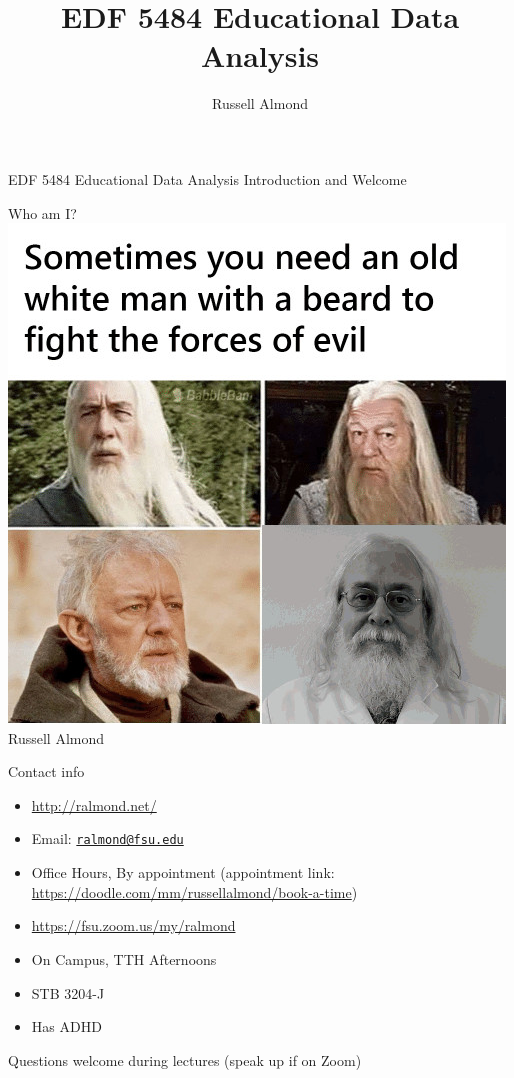 \documentclass[
  ignorenonframetext,
]{beamer}
\title{EDF 5484 Educational Data Analysis}
\author{Russell Almond}
\date{}
\providecommand{\tightlist}{%
  \setlength{\itemsep}{0pt}\setlength{\parskip}{0pt}}
\begin{document}
\frame{\titlepage}

\begin{frame}{EDF 5484 Educational Data Analysis}
\protect\hypertarget{edf-5484-educational-data-analysis}{}
Introduction and Welcome
\end{frame}

\begin{frame}{Who am I?}
\protect\hypertarget{who-am-i}{}
\includegraphics[width=\textwidth,height=0.75\textheight]{img/sometimes-you-need-an-old-white-man-with-a-beard.jpg}
Russell Almond
\end{frame}

\begin{frame}{Contact info}
\protect\hypertarget{contact-info}{}
\begin{itemize}
\tightlist
\item
  \url{http://ralmond.net/}
\item
  Email: \href{mailto:ralmond@fsu.edu}{\nolinkurl{ralmond@fsu.edu}}
\item
  Office Hours, By appointment (appointment link:
  \url{https://doodle.com/mm/russellalmond/book-a-time})
\item
  \url{https://fsu.zoom.us/my/ralmond}
\item
  On Campus, TTH Afternoons
\item
  STB 3204-J
\item
  Has ADHD
\end{itemize}

Questions welcome during lectures (speak up if on Zoom)
\end{frame}
\end{document}

